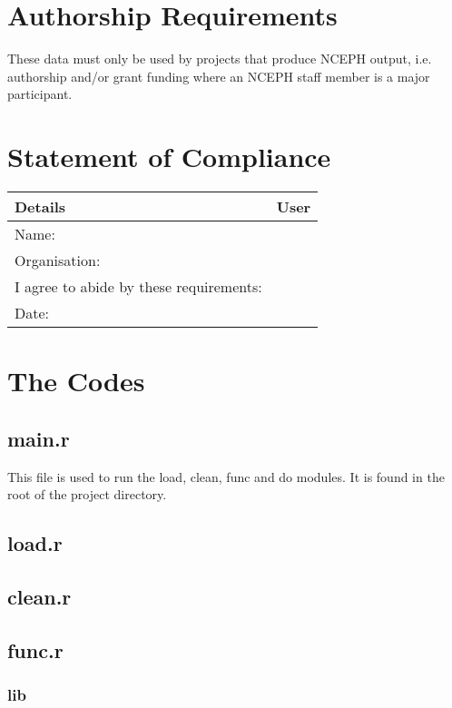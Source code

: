\documentclass[a4paper]{article}
\begin{document}
\section{Authorship Requirements}
\label{sec-4}

These data must only be used by projects that produce NCEPH output, i.e. authorship and/or grant funding where an NCEPH staff member is a major participant.
\section{Statement of Compliance}
\label{sec-5}



\begin{center}
\begin{tabular}{ll}
 Details                                  &  User  \\
\hline
 Name:                                    &        \\
 Organisation:                            &        \\
 I agree to abide by these requirements:  &        \\
 Date:                                    &        \\
\hline
\end{tabular}
\end{center}
\section{The Codes}
\label{sec-6}
\subsection{main.r}
\label{sec-6-1}

This file is used to run the load, clean, func and do modules.  It is found in the root of the project directory.
\subsection{load.r}
\label{sec-6-2}
\subsection{clean.r}
\label{sec-6-3}
\subsection{func.r}
\label{sec-6-4}
\subsubsection{lib}
\label{sec-6-4-1}
\end{document}
